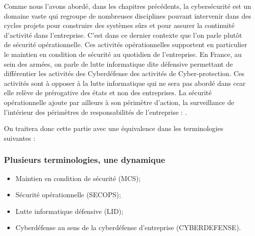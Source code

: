 Comme nous l’avons abordé, dans les chapitres précédents, la cybersécurité est un domaine vaste qui regroupe de nombreuses disciplines pouvant intervenir dans des cycles projets pour construire des systèmes sûrs et pour assurer la continuité d’activité dans l'entreprise.
C’est dans ce dernier contexte que l’on parle plutôt de sécurité opérationnelle. Ces activités opérationnelles supportent en particulier le maintien en condition de sécurité au quotidien de l’entreprise. En France, au sein des armées, on parle de lutte informatique dite défensive permettant de différentier les activités des Cyberdéfense des activités de Cyber-protection. Ces activités sont à opposer à la lutte informatique qui ne sera pas abordé dans c\ecours car elle relève de prérogative des états et non des entreprises.
La sécurité opérationnelle ajoute par ailleurs à son périmètre d'action, la surveillance de l'intérieur des périmètres de responsabilités de l'entreprise : .

On traitera donc cette partie avec une équivalence dans les terminologies suivantes :

\begin{frame}
\frametitle<presentation>{Plusieurs terminologies, une dynamique}
	\begin{itemize}
		\item Maintien en condition de sécurité (MCS);
		\item Sécurité opérationnelle (SECOPS);
		\item Lutte informatique défensive (LID);
		\item Cyberdéfense au sens de la cyberdéfense d'entreprise (CYBERDEFENSE).
	\end{itemize}
\end{frame}

